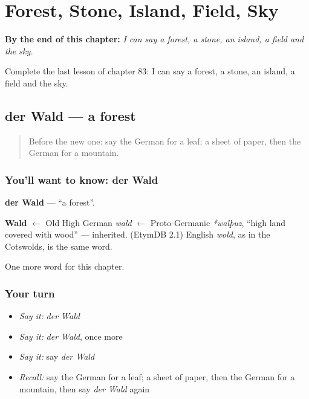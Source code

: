 
\chapter{Forest, Stone, Island, Field, Sky}
\label{ch:ge-forest-stone-island-field-sky}

\begin{chapteropening}
\textbf{By the end of this chapter:} \emph{I can say a forest, a stone, an island, a field and the sky.}

Complete the last lesson of chapter 83: I can say a forest, a stone, an island, a field and the sky.
\end{chapteropening}

\section[der Wald]{der Wald — a forest}

\label{lesson:GE-C83-wald}



\begin{quote}
Before the new one: say the German for a leaf; a sheet of paper, then the German for a mountain.
\end{quote}

\subsection*{You'll want to know: der Wald}
\textbf{der Wald} — \textquotedblleft{}a forest\textquotedblright{}.

\begin{cousinweb}
\textbf{Wald} $\leftarrow$ Old High German \emph{wald} $\leftarrow$ Proto-Germanic \emph{*walþuz}, \textquotedblleft{}high land covered with wood\textquotedblright{} — inherited. (EtymDB 2.1) English \emph{wold}, as in the Cotswolds, is the same word.
\end{cousinweb}

\begin{grammarlens}[title={What you've built}]
One more word for this chapter.
\end{grammarlens}

\subsection*{Your turn}
\begin{itemize}
\raggedright
  \item \emph{Say it:} \emph{der Wald}
  \item \emph{Say it:} \emph{der Wald}, once more
  \item \emph{Say it:} say \emph{der Wald}
  \item \emph{Recall:} say the German for a leaf; a sheet of paper, then the German for a mountain, then say \emph{der Wald} again
\end{itemize}

